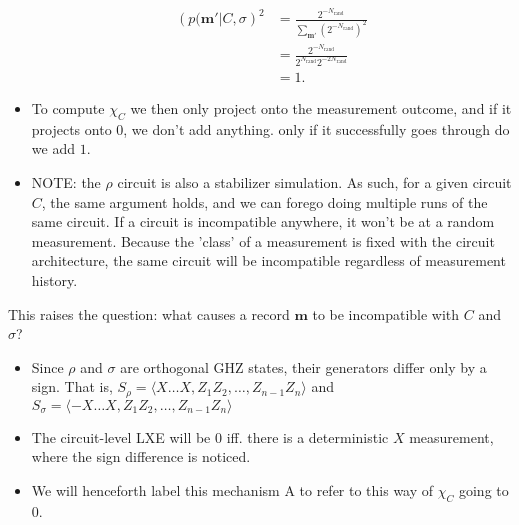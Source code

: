 \begin{itemize}
\begin{align}
{            \left(p(\mathbf{m}' | C, \sigma \right)^2} &= \frac{
            2^{-N_\mathrm{rand}}}{\sum_{\mathbf{m}'}\left(2^{-N_\mathrm{rand}}\right)^2}
            \\ &= \frac{2^{-N_\mathrm{rand}}}{2^{N_\mathrm{rand}}
        2^{-2N_\mathrm{rand}}} \\ &= 1 
      .\end{align} 
  \item To compute $\chi_C$ we then only project onto the measurement outcome,
    and if it projects onto $0$, we don't add anything. only if it successfully
    goes through do we add $1$.
  \item NOTE: the $\rho$ circuit is also a stabilizer simulation.  As such, for
    a given circuit $C$, the same argument holds, and we can forego doing
    multiple runs of the same circuit. If a circuit is incompatible anywhere,
    it won't be at a random measurement.  Because the 'class' of a measurement
    is fixed with the circuit architecture, the same circuit will be
    incompatible regardless of measurement history.
\end{itemize}

This raises the question: what causes a record $\mathbf{m}$ to be incompatible
with $C$ and $\sigma$?
\begin{itemize}
  \item Since $\rho$ and $\sigma$ are orthogonal GHZ states, their generators
    differ only by a sign. That is, $S_\rho = \langle X\ldots X,
    Z_1Z_2,\ldots,Z_{n-1}Z_n\rangle$ and $S_\sigma = \langle -X\ldots X,
    Z_1Z_2,\ldots,Z_{n-1}Z_n\rangle$
  \item The circuit-level LXE will be $0$ iff. there is a deterministic $X$
    measurement, where the sign difference is noticed.
  \item We will henceforth label this mechanism \textsf{A} to refer to this way of
    $\chi_C$ going to $0$.
\end{itemize}

